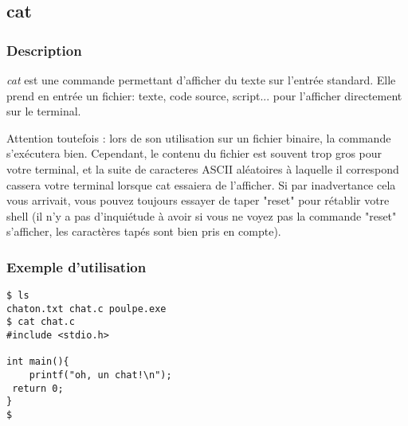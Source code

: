 \subsection{cat}
\subsubsection{Description}
\emph{cat} est une commande permettant d'afficher du texte sur l'entrée standard.
Elle prend en entrée un fichier: texte, code source, script... pour l'afficher directement sur le terminal.

Attention toutefois : lors de son utilisation sur un fichier binaire, la commande s'exécutera bien. Cependant, le contenu du fichier est souvent trop gros pour votre terminal, et la suite de caracteres ASCII aléatoires à laquelle il correspond cassera votre terminal lorsque cat essaiera de l'afficher.
Si par inadvertance cela vous arrivait, vous pouvez toujours essayer de taper "reset" pour rétablir votre shell (il n'y a pas d'inquiétude à avoir si vous ne voyez pas la commande "reset" s'afficher, les caractères tapés sont bien pris en compte).


\subsubsection{Exemple d'utilisation}

\begin{lstlisting}
$ ls
chaton.txt chat.c poulpe.exe
$ cat chat.c
#include <stdio.h>

int main(){
	printf("oh, un chat!\n");
 return 0;
}
$
\end{lstlisting}
